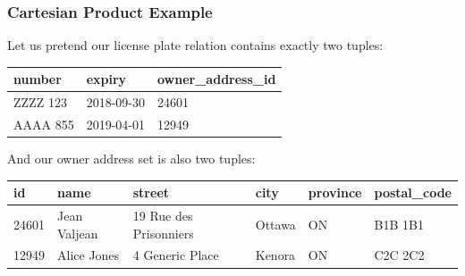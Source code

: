 \begin{frame}
\frametitle{Cartesian Product Example}

Let us pretend our license plate relation contains exactly two tuples:

{\small
\begin{center}
\begin{tabular}{|l|l|l|}\hline
	\textbf{number} & \textbf{expiry} & \textbf{owner\_address\_id} \\ \hline
	ZZZZ 123 & 2018-09-30 & 24601 \\ \hline
	AAAA 855 & 2019-04-01 & 12949 \\ \hline
\end{tabular}
\end{center}
}

And our owner address set is also two tuples: 

{\small
\begin{center}
	\begin{tabular}{|l|l|l|l|l|l|}\hline
		\textbf{id} & \textbf{name} &\textbf{street} & \textbf{city} & \textbf{province} & \textbf{postal\_code} \\ \hline
		24601 & Jean Valjean & 19 Rue des Prisonniers & Ottawa & ON & B1B 1B1\\ \hline
		12949 & Alice Jones & 4 Generic Place & Kenora & ON & C2C 2C2\\ \hline
	\end{tabular}
\end{center}
}


\end{frame}



